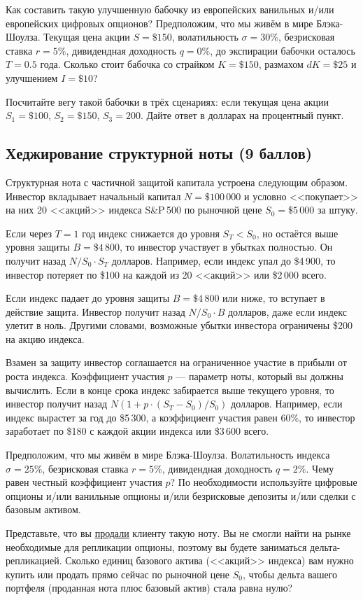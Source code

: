 \documentclass[a4paper,14pt]{extarticle}
\begin{document}
Как составить такую улучшенную бабочку из европейских ванильных и/или европейских цифровых опционов? Предположим, что мы живём в мире Блэка-Шоулза. Текущая цена акции $S=\$150$, волатильность $\sigma=30\%$, безрисковая ставка $r=5\%$, дивидендная доходность $q=0\%$, до экспирации бабочки осталось $T=0.5$ года. Сколько стоит бабочка со страйком $K=\$150$, размахом $dK=\$25$ и улучшением $I=\$10$?

Посчитайте вегу такой бабочки  в трёх сценариях: если текущая цена акции $S_1=\$100$, $S_2=\$150$, $S_3=200$. Дайте ответ в долларах на процентный пункт.

\subsection{Хеджирование структурной ноты (9 баллов)}

Структурная нота с частичной защитой капитала устроена следующим образом. Инвестор вкладывает начальный капитал $N=\$100\,000$ и условно <<покупает>> на них 20 <<акций>> индекса S\&P\,500 по рыночной цене $S_0=\$5\,000$ за штуку.

Если через $T=1$ год индекс снижается до уровня $S_T < S_0$, но остаётся выше уровня защиты $B=\$4\,800$, то инвестор участвует в убытках полностью. Он получит назад $N/S_0 \cdot S_T$ долларов. Например, если индекс упал до \$4\,900, то инвестор потеряет по \$100 на каждой из 20 <<акций>> или \$2\,000 всего.

Если индекс падает до уровня защиты $B=\$4\,800$ или ниже, то вступает в действие защита. Инвестор получит назад $N/S_0 \cdot B$ долларов, даже если индекс улетит в ноль. Другими словами, возможные убытки инвестора ограничены \$200 на акцию индекса.

Взамен за защиту инвестор соглашается на ограниченное участие в прибыли от роста индекса. Коэффициент участия $p$ --- параметр ноты, который вы должны вычислить. Если в конце срока индекс забирается выше текущего уровня, то инвестор получит назад $N(1+ p \cdot (S_T - S_0)/S_0)$ долларов. Например, если индекс вырастет за год до \$5\,300, а коэффициент участия равен 60\%, то инвестор заработает по \$180 с каждой акции индекса или \$3\,600 всего.

Предположим, что мы живём в мире Блэка-Шоулза. Волатильность индекса $\sigma=25\%$, безрисковая ставка $r=5\%$, дивидендная доходность $q=2\%$. Чему равен честный коэффициент участия $p$? По необходимости используйте цифровые опционы и/или ванильные опционы и/или безрисковые депозиты и/или сделки с базовым активом.

Представьте, что вы \underline{продали} клиенту такую ноту. Вы не смогли найти на рынке необходимые для репликации опционы, поэтому вы будете заниматься дельта-репликацией. Сколько единиц базового актива (<<акций>> индекса) вам нужно купить или продать прямо сейчас по рыночной цене $S_0$, чтобы дельта вашего портфеля (проданная нота плюс базовый актив) стала равна нулю?
\end{document}
